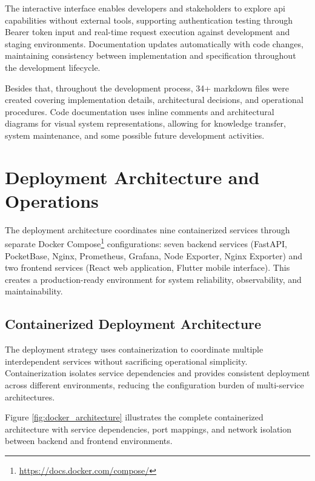 The interactive interface enables developers and stakeholders to explore \ac{api} capabilities without external tools, supporting authentication testing through Bearer token input and real-time request execution against development and staging environments. Documentation updates automatically with code changes, maintaining consistency between implementation and specification throughout the development lifecycle.

Besides that, throughout the development process, 34+ markdown files were created covering implementation details, architectural decisions, and operational procedures. Code documentation uses inline comments and architectural diagrams for visual system representations, allowing for knowledge transfer, system maintenance, and some possible future development activities.


\section{Deployment Architecture and Operations} \label{section:deployment_operations}

The deployment architecture coordinates nine containerized services through separate Docker Compose\footnote{\url{https://docs.docker.com/compose/}} configurations: seven backend services (FastAPI, PocketBase, Nginx, Prometheus, Grafana, Node Exporter, Nginx Exporter) and two frontend services (React web application, Flutter mobile interface). This creates a production-ready environment for system reliability, observability, and maintainability.

\subsection{Containerized Deployment Architecture} \label{subsection:container_deployment}

The deployment strategy uses containerization to coordinate multiple interdependent services without sacrificing operational simplicity. Containerization isolates service dependencies and provides consistent deployment across different environments, reducing the configuration burden of multi-service architectures.

Figure \ref{fig:docker_architecture} illustrates the complete containerized architecture with service dependencies, port mappings, and network isolation between backend and frontend environments.

